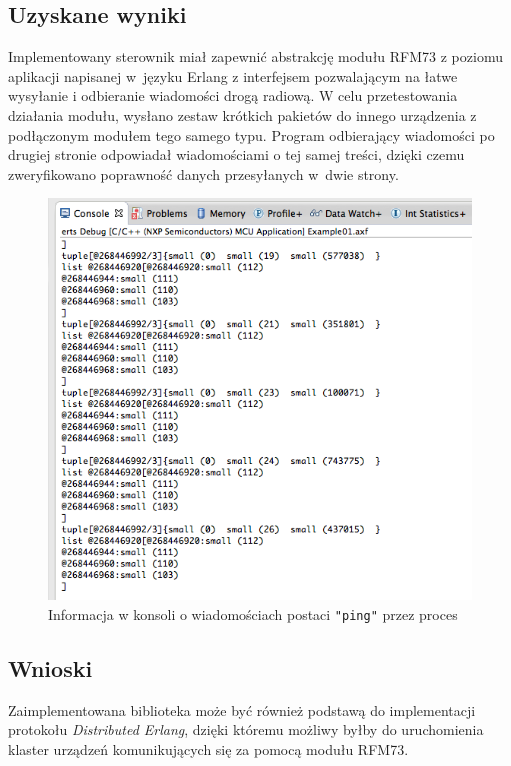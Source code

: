 \subsection{Uzyskane wyniki}

Implementowany sterownik miał zapewnić abstrakcję modułu RFM73 z poziomu aplikacji napisanej w~języku Erlang z interfejsem pozwalającym na łatwe wysyłanie i odbieranie wiadomości drogą radiową. W celu przetestowania działania modułu, wysłano zestaw krótkich pakietów do innego urządzenia z podłączonym modułem tego samego typu. Program odbierający wiadomości po drugiej stronie odpowiadał wiadomościami o tej samej treści, dzięki czemu zweryfikowano poprawność danych przesyłanych w~dwie strony.

\begin{figure}[h]
\centerline{\includegraphics[scale=0.7]{console_rfm}}
\caption{Informacja w konsoli o wiadomościach postaci \texttt{"ping"} przez proces}
\label{fig:consolerfm}
\end{figure}


\subsection{Wnioski}

Zaimplementowana biblioteka może być również podstawą do implementacji protokołu \emph{Distributed Erlang}, dzięki któremu możliwy byłby do uruchomienia klaster urządzeń komunikujących się za pomocą modułu RFM73.